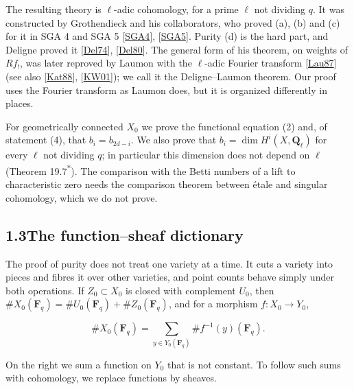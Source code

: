 \documentclass[11pt]{article}
\newcommand{\bpout}[1]{#1\textsuperscript{\hyperlink{bp-outside}{\ensuremath{\ast}}}}
\begin{document}
The resulting theory is \(\ell\)-adic cohomology, for a prime \(\ell\) not dividing \(q\). It was constructed by Grothendieck and his collaborators, who proved (a), (b) and (c) for it in SGA 4 and SGA 5 [\hyperref[bp26]{SGA4}], [\hyperref[bp27]{SGA5}]. Purity (d) is the hard part, and Deligne proved it [\hyperref[bp28]{Del74}], [\hyperref[bp29]{Del80}]. The general form of his theorem, on weights of \(Rf_!\), was later reproved by Laumon with the \(\ell\)-adic Fourier transform [\hyperref[bp30]{Lau87}] (see also [\hyperref[bp31]{Kat88}], [\hyperref[bp32]{KW01}]); we call it the Deligne–Laumon theorem. Our proof uses the Fourier transform as Laumon does, but it is organized differently in places.

For geometrically connected \(X_0\) we prove the functional equation (2) and, of statement (4), that \(b_i=b_{2d-i}\). We also prove that \(b_i=\dim H^i(X,\mathbf Q_\ell)\) for every \(\ell\) not dividing \(q\); in particular this dimension does not depend on \(\ell\) (Theorem \bpout{19.7}). The comparison with the Betti numbers of a lift to characteristic zero needs the comparison theorem between étale and singular cohomology, which we do not prove.


\subsection*{\texorpdfstring{1.3\quad The function–sheaf dictionary}{1.3 The function–sheaf dictionary}}
\label{bp7}%
\label{bp8}%
The proof of purity does not treat one variety at a time. It cuts a variety into pieces and fibres it over other varieties, and point counts behave simply under both operations. If \(Z_0\subset X_0\) is closed with complement \(U_0\), then \(\#X_0(\mathbf F_q)=\#U_0(\mathbf F_q)+\#Z_0(\mathbf F_q)\), and for a morphism \(f:X_0\to Y_0\),

\[
\#X_0(\mathbf F_q)=\sum_{y\in Y_0(\mathbf F_q)}\#f^{-1}(y)(\mathbf F_q).
\]

On the right we sum a function on \(Y_0\) that is not constant. To follow such sums with cohomology, we replace functions by sheaves.
\end{document}
